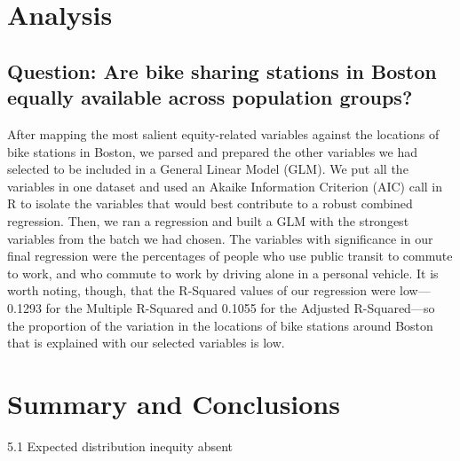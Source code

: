 \documentclass[
  12pt,
]{article}
\begin{document}
\newpage

\hypertarget{analysis}{%
\section{Analysis}\label{analysis}}

\hypertarget{question-are-bike-sharing-stations-in-boston-equally-available-across-population-groups}{%
\subsection{Question: Are bike sharing stations in Boston equally
available across population
groups?}\label{question-are-bike-sharing-stations-in-boston-equally-available-across-population-groups}}

After mapping the most salient equity-related variables against the
locations of bike stations in Boston, we parsed and prepared the other
variables we had selected to be included in a General Linear Model
(GLM). We put all the variables in one dataset and used an Akaike
Information Criterion (AIC) call in R to isolate the variables that
would best contribute to a robust combined regression. Then, we ran a
regression and built a GLM with the strongest variables from the batch
we had chosen. The variables with significance in our final regression
were the percentages of people who use public transit to commute to
work, and who commute to work by driving alone in a personal vehicle. It
is worth noting, though, that the R-Squared values of our regression
were low---0.1293 for the Multiple R-Squared and 0.1055 for the Adjusted
R-Squared---so the proportion of the variation in the locations of bike
stations around Boston that is explained with our selected variables is
low.

\newpage

\hypertarget{summary-and-conclusions}{%
\section{Summary and Conclusions}\label{summary-and-conclusions}}

5.1 Expected distribution inequity absent
\end{document}
